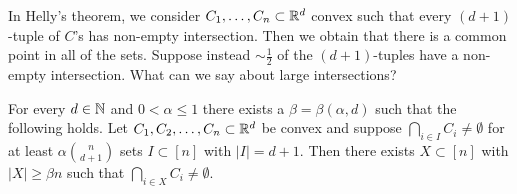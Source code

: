 \begin{remark}
In Helly's theorem, we consider $C_1,\dotsc,C_n\subset \mathbb{R}^d$ convex such that every $(d+1)$-tuple of $C$'s has non-empty intersection. Then we obtain that there is a common point in all of the sets. Suppose instead $\sim \frac{1}{2}$ of the $(d+1)$-tuples have a non-empty intersection. What can we say about large intersections?
\end{remark}
\begin{theorem}
For every $d\in \mathbb{N}$ and $0< \alpha \leq 1$ there exists a $\beta = \beta(\alpha,d)$ such that the following holds. Let $C_1, C_2,\dotsc,C_n\subset \mathbb{R}^d$ be convex and suppose $\bigcap_{i\in I} C_i\neq \emptyset$ for at least $\alpha {n\choose d+1}$ sets $I\subset[n]$ with $|I| = d+1$. Then there exists $X \subset [n]$ with $|X|\geq \beta n$ such that $\bigcap_{i\in X} C_i \neq \emptyset$.

\end{theorem}

